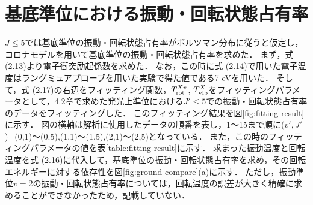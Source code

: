 \section{基底準位における振動・回転状態占有率}
$J \leq 5$では基底準位の振動・回転状態占有率がボルツマン分布に従うと仮定し，コロナモデルを用いて基底準位の振動・回転状態占有率を求めた．
まず，式 (2.13)より電子衝突励起係数を求めた．
なお，この時に式 (2.14)で用いた電子温度はラングミュアプローブを用いた実験で得た値である7 eV\cite{yun}を用いた．
そして，式 (2.17)の右辺をフィッティング関数，$T^{Xv}_{\rm rot}$, $T^X_{\rm vib}$をフィッティングパラメータとして，4.2章で求めた発光上準位における$J' \leq 5$での振動・回転状態占有率のデータをフィッティングした．
このフィッティング結果を図\ref{fig:fitting-result}に示す．
図の横軸は解析に使用したデータの順番を表し，1〜15まで順に($v',J'$)=(0,1)〜(0.5),(1,1)〜(1,5),(2,1)〜(2,5)となっている．
また，この時のフィッティングパラメータの値を表\ref{table:fitting-result}に示す．
求まった振動温度と回転温度を式 (2.16)に代入して，基底準位の振動・回転状態占有率を求め，その回転エネルギーに対する依存性を図\ref{fig:ground-compare}(a)に示す．
ただし，振動準位$v=2$の振動・回転状態占有率については，回転温度の誤差が大きく精確に求めることができなかったため，記載していない．